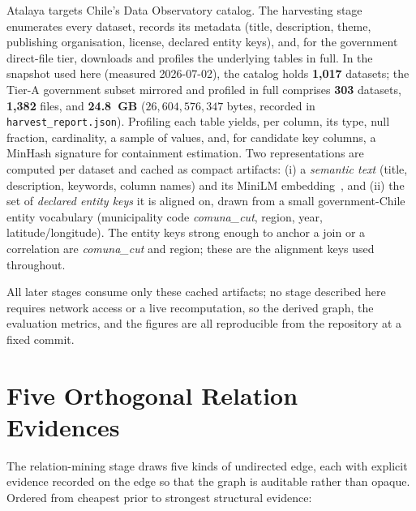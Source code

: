 \documentclass[journal]{IEEEtran}
\newcommand{\dsname}[1]{\textit{#1}}
\begin{document}
Atalaya targets Chile's Data Observatory catalog. The harvesting stage enumerates every dataset, records its
metadata (title, description, theme, publishing organisation, license, declared entity keys), and, for the
government direct-file tier, downloads and profiles the underlying tables in full. In the snapshot used here
(measured 2026-07-02), the catalog holds \textbf{1{,}017} datasets; the Tier-A government subset mirrored and
profiled in full comprises \textbf{303} datasets, \textbf{1{,}382} files, and \textbf{24.8~GB}
($26{,}604{,}576{,}347$ bytes, recorded in \texttt{harvest\_report.json}). Profiling each table yields,
per column, its type, null fraction, cardinality, a sample of values, and, for candidate key columns, a MinHash
signature for containment estimation. Two representations are computed per dataset and cached as compact
artifacts: (i) a \emph{semantic text} (title, description, keywords, column names) and its MiniLM
embedding~\cite{minilm}, and (ii) the set of \emph{declared entity keys} it is aligned on, drawn from a small
government-Chile entity vocabulary (municipality code \dsname{comuna\_cut}, region, year, latitude/longitude).
The entity keys strong enough to anchor a join or a correlation are \dsname{comuna\_cut} and region; these are
the alignment keys used throughout.

All later stages consume only these cached artifacts; no stage described here requires network access or a live
recomputation, so the derived graph, the evaluation metrics, and the figures are all reproducible from the
repository at a fixed commit.

\section{Five Orthogonal Relation Evidences}\label{sec:evidence}

The relation-mining stage draws five kinds of undirected edge, each with explicit evidence recorded on the edge
so that the graph is auditable rather than opaque. Ordered from cheapest prior to strongest structural evidence:
\end{document}
